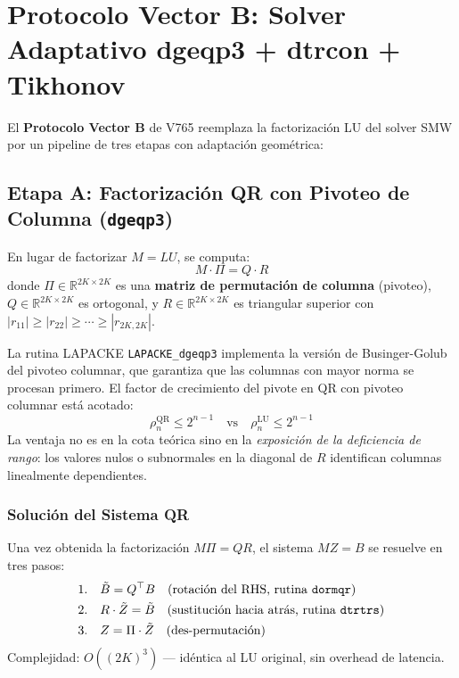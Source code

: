 \section{Protocolo Vector B: Solver Adaptativo dgeqp3 + dtrcon + Tikhonov}

El \textbf{Protocolo Vector B} de V765 reemplaza la factorización LU del solver SMW
por un pipeline de tres etapas con adaptación geométrica:

\subsection{Etapa A: Factorización QR con Pivoteo de Columna (\texttt{dgeqp3})}

En lugar de factorizar $M = LU$, se computa:
\begin{equation}
  M \cdot \Pi = Q \cdot R
  \label{eq:qrpivot}
\end{equation}
donde $\Pi \in \mathbb{R}^{2K \times 2K}$ es una \textbf{matriz de permutación de columna}
(pivoteo), $Q \in \mathbb{R}^{2K \times 2K}$ es ortogonal, y $R \in \mathbb{R}^{2K \times 2K}$
es triangular superior con $|r_{11}| \ge |r_{22}| \ge \cdots \ge |r_{2K,2K}|$.

La rutina LAPACKE \texttt{LAPACKE\_dgeqp3} implementa la versión de Businger-Golub del
pivoteo columnar, que garantiza que las columnas con mayor norma se procesan primero.
El factor de crecimiento del pivote en QR con pivoteo columnar está acotado:
\begin{equation}
  \rho_n^{\text{QR}} \le 2^{n-1} \quad \text{vs} \quad \rho_n^{\text{LU}} \le 2^{n-1}
\end{equation}
La ventaja no es en la cota teórica sino en la \textit{exposición de la deficiencia de rango}:
los valores nulos o subnormales en la diagonal de $R$ identifican columnas linealmente dependientes.

\subsubsection{Solución del Sistema QR}

Una vez obtenida la factorización $M\Pi = QR$, el sistema $MZ = B$ se resuelve en tres pasos:
\begin{align}
  1.\quad & \tilde{B} = Q^\top B \quad \text{(rotación del RHS, rutina \texttt{dormqr})} \\
  2.\quad & R \cdot \tilde{Z} = \tilde{B} \quad \text{(sustitución hacia atrás, rutina \texttt{dtrtrs})} \\
  3.\quad & Z = \Pi \cdot \tilde{Z} \quad \text{(des-permutación)}
\end{align}
Complejidad: $O((2K)^3)$ — idéntica al LU original, sin overhead de latencia.

